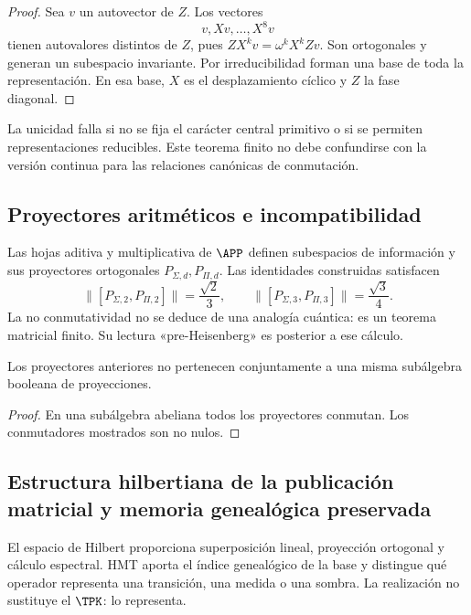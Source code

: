 \begin{proof}
Sea \(v\) un autovector de \(Z\). Los vectores
\[
  v,Xv,\ldots,X^8v
\]
tienen autovalores distintos de \(Z\), pues
\(ZX^kv=\omega^kX^kZv\). Son ortogonales y generan un subespacio
invariante. Por irreducibilidad forman una base de toda la representación.
En esa base, \(X\) es el desplazamiento cíclico y \(Z\) la fase diagonal.
\end{proof}

\begin{controlbox}
La unicidad falla si no se fija el carácter central primitivo o si se
permiten representaciones reducibles. Este teorema finito no debe confundirse
con la versión continua para las relaciones canónicas de conmutación.
\end{controlbox}

\subsection{Proyectores aritméticos e incompatibilidad}

Las hojas aditiva y multiplicativa de \(\APP\) definen subespacios de
información y sus proyectores ortogonales
\(P_{\Sigma,d},P_{\Pi,d}\). Las identidades construidas satisfacen
\[
 \|[P_{\Sigma,2},P_{\Pi,2}]\|
 =\frac{\sqrt2}{3},
 \qquad
 \|[P_{\Sigma,3},P_{\Pi,3}]\|
 =\frac{\sqrt3}{4}.
\]
La no conmutatividad no se deduce de una analogía cuántica: es un teorema
matricial finito. Su lectura «pre-Heisenberg» es posterior a ese cálculo.

\begin{proposition}
Los proyectores anteriores no pertenecen conjuntamente a una misma
subálgebra booleana de proyecciones.
\end{proposition}

\begin{proof}
En una subálgebra abeliana todos los proyectores conmutan. Los conmutadores
mostrados son no nulos.
\end{proof}

\subsection{Estructura hilbertiana de la publicación matricial y memoria genealógica preservada}

El espacio de Hilbert proporciona superposición lineal, proyección ortogonal
y cálculo espectral. HMT aporta el índice genealógico de la base y distingue
qué operador representa una transición, una medida o una sombra. La
realización no sustituye el \(\TPK\): lo representa.

